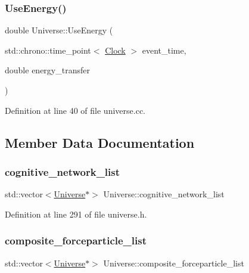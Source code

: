 \subsubsection{\texorpdfstring{Use\+Energy()}{UseEnergy()}}
{\footnotesize\ttfamily double Universe\+::\+Use\+Energy (\begin{DoxyParamCaption}\item[{std\+::chrono\+::time\+\_\+point$<$ \mbox{\hyperlink{universe_8h_a0ef8d951d1ca5ab3cfaf7ab4c7a6fd80}{Clock}} $>$}]{event\+\_\+time,  }\item[{double}]{energy\+\_\+transfer }\end{DoxyParamCaption})}



Definition at line 40 of file universe.\+cc.



\subsection{Member Data Documentation}
\mbox{\label{class_universe_a7a0e9796ff0d650a8b1fbde5fa5b761f}} 
\subsubsection{\texorpdfstring{cognitive\+\_\+network\+\_\+list}{cognitive\_network\_list}}
{\footnotesize\ttfamily std\+::vector$<$\mbox{\hyperlink{class_universe}{Universe}}$\ast$$>$ Universe\+::cognitive\+\_\+network\+\_\+list\hspace{0.3cm}{\ttfamily [protected]}}



Definition at line 291 of file universe.\+h.

\mbox{\label{class_universe_ae9795d06e406c4322637825aa545aa2f}} 
\subsubsection{\texorpdfstring{composite\+\_\+forceparticle\+\_\+list}{composite\_forceparticle\_list}}
{\footnotesize\ttfamily std\+::vector$<$\mbox{\hyperlink{class_universe}{Universe}}$\ast$$>$ Universe\+::composite\+\_\+forceparticle\+\_\+list\hspace{0.3cm}{\ttfamily [protected]}}



